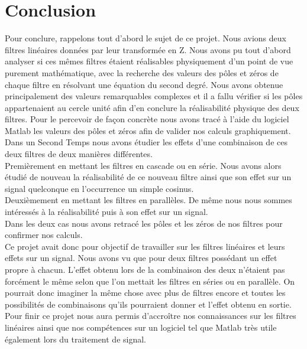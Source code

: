 \documentclass[12,french]{report}
\begin{document}
\chapter*{Conclusion}

Pour conclure, rappelons tout d'abord le sujet de ce projet. Nous avions deux filtres linéaires données par leur transformée en Z. Nous avons pu tout d'abord analyser si ces mêmes filtres étaient réalisables physiquement d'un point de vue purement mathématique, avec la recherche des valeurs des pôles et zéros de chaque filtre en résolvant une équation du second degré. Nous avons obtenue principalement des valeurs remarquables complexes et il a fallu vérifier si les pôles appartenaient au cercle unité afin d'en conclure la réalisabilité physique des deux filtres. Pour le percevoir de façon concrète nous avons tracé à l'aide du logiciel Matlab les valeurs des pôles et zéros afin de valider nos calculs graphiquement.\\


Dans un Second Temps nous avons étudier les effets d'une combinaison de ces deux filtres de deux manières différentes.\\
Premièrement en mettant les filtres en cascade ou en série. Nous avons alors étudié de nouveau la réalisabilité de ce nouveau filtre ainsi que son effet sur un signal quelconque en l'occurrence un simple cosinus.\\
Deuxièmement en mettant les filtres en parallèles. De même nous nous sommes intéressés   à la réalisabilité puis à son effet sur un signal.\\
Dans les deux cas nous avons retracé les pôles et les zéros de nos filtres pour confirmer nos calculs.\\


Ce projet avait donc pour objectif de travailler sur les filtres linéaires et leurs effets sur un signal. Nous avons vu que pour deux filtres possédant un effet propre à chacun. L'effet obtenu lors de la combinaison des deux n'étaient pas forcément le même selon que l'on mettait les filtres en séries ou en parallèle. On pourrait donc imaginer la même chose avec plus de filtres encore et toutes les possibilités de combinaisons qu'ils pourraient donner et l'effet obtenu en sortie.\\


Pour finir ce projet nous aura permis d'accroître nos connaissances sur les filtres linéaires ainsi que nos compétences sur un logiciel tel que Matlab très utile également lors du traitement de signal. 
\end{document}

